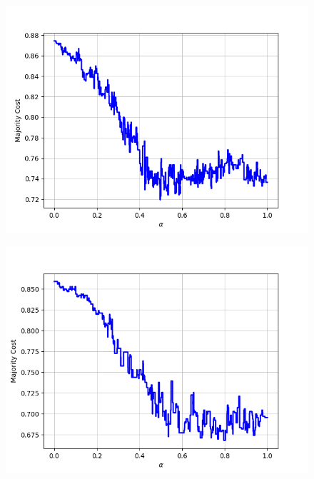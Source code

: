 \begin{figure}[H]
\begin{minipage}{.24\textwidth}
  {\includegraphics[width=\linewidth]{plots/omniglot-intra-ac/Malay_(Jawi_-_Arabic)}}
\end{minipage}
\begin{minipage}{.24\textwidth}
  \centering
  {\includegraphics[width=\linewidth]{plots/omniglot-intra-ac/Mkhedruli_(Georgian)}}
\end{minipage}
\begin{minipage}{.24\textwidth}
  \centering

\end{minipage}
\end{figure}
